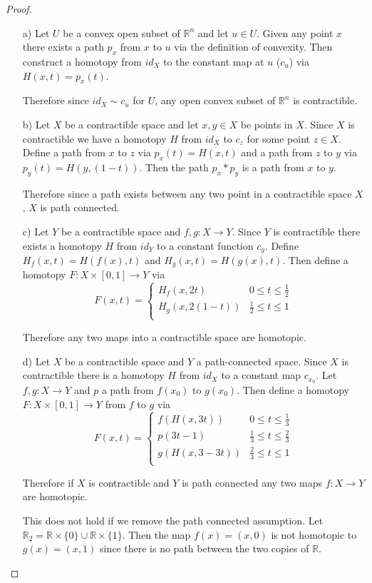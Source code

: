 \documentclass[10pt]{article}
\newcommand{\bb}[1]{\mathbb{#1}}
\theoremstyle{plain}
\theoremstyle{remark}
\begin{document}
\begin{proof}
  \begin{itemize}
  \item[a)] Let $U$ be a convex open subset of $\bb{R}^n$ and let $u\in U$. 
    Given any point $x$ there exists a path $p_x$ from $x$ to $u$ via the definition
    of convexity. Then construct a homotopy from $id_X$  to the constant map at $u$
    ($c_u$) via $H(x,t)=p_x(t)$.

    Therefore since $id_X\sim c_u$ for $U$, any open convex subset of $\bb{R}^n$ is
    contractible.
  \item[b)] Let $X$ be a contractible space and let $x,y\in X$ be points in $X$.
    Since $X$ is contractible we have a homotopy $H$ from $id_X$ to $c_z$ for some
    point $z\in X$. Define a path from $x$ to $z$ via $p_x(t)=H(x,t)$ and a path
    from $z$ to $y$ via $p_y(t)=H(y,(1-t))$. Then the path $p_x*p_y$ is a path
    from $x$ to $y$.

    Therefore since a path exists between any two point in a contractible space $X$,
    $X$ is path connected.
  \item[c)] Let $Y$ be a contractible space and $f,g:X\rightarrow Y$. Since $Y$ is
    contractible there exists a homotopy $H$ from $id_Y$ to a constant function
    $c_y$. Define $H_f(x,t)=H(f(x),t)$ and $H_g(x,t)=H(g(x),t)$. Then define
    a homotopy $F:X\times[0,1]\rightarrow Y$ via
    \[
      F(x,t) = \left\{
        \begin{array}{cc}
          H_f(x,2t) & 0\leq t \leq \frac{1}{2}\\
          H_g(x,2(1-t)) & \frac{1}{2}\leq  t\leq 1\\
        \end{array}
        \right.
      \]

      Therefore any two maps into a contractible space are homotopic.
    \item[d)] Let $X$ be a contractible space and $Y$ a path-connected space. Since
      $X$ is contractible there is a homotopy $H$ from $id_X$ to a constant map $c_{x_0}$.
      Let $f,g:X\rightarrow Y$ and $p$ a path from $f(x_0)$ to $g(x_0)$. Then define
      a homotopy $F:X\times[0,1]\rightarrow Y$ from $f$ to $g$ via
      \[
        F(x,t) = \left\{
          \begin{array}{cc}
            f(H(x,3t)) & 0\leq t\leq \frac{1}{3}\\
            p(3t-1) & \frac{1}{3}\leq t\leq\frac{2}{3}\\
            g(H(x,3-3t)) & \frac{2}{3}\leq t \leq 1\\
          \end{array}
        \right.
      \]

      Therefore if $X$ is contractible and $Y$ is path connected any two maps
      $f:X\rightarrow Y$ are homotopic.

      This does not hold if we remove the path connected assumption. Let
      $\bb{R}_2=\bb{R}\times\{0\}\cup \bb{R}\times\{1\}$. Then
      the map $f(x)=(x,0)$ is not homotopic to $g(x)=(x,1)$ since there is no path
      between the two copies of $\bb{R}$.
  \end{itemize}
\end{proof}
\end{document}
